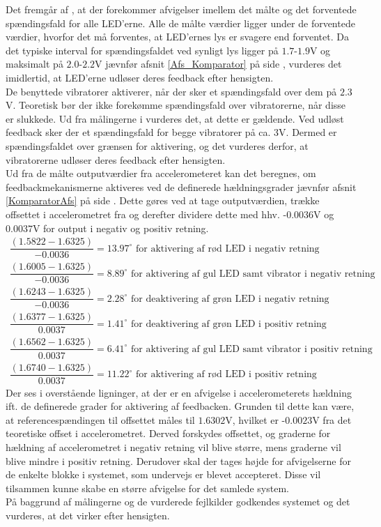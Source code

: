 Det fremgår af , at der forekommer afvigelser imellem det målte og det forventede spændingsfald for alle LED'erne. Alle de målte værdier ligger under de forventede værdier, hvorfor det må forventes, at LED'ernes lys er svagere end forventet. Da det typiske interval for spændingsfaldet ved synligt lys ligger på $1.7$-$1.9$V og maksimalt på $2.0$-$2.2$V jævnfør afsnit \ref{Afs_Komparator} på side \pageref{Afs_Komparator}, vurderes det imidlertid, at LED'erne udløser deres feedback efter hensigten.\\
De benyttede vibratorer aktiverer, når der sker et spændingsfald over dem på $2.3$V. \cite{Machinery2009} Teoretisk bør der ikke forekømme spændingsfald over vibratorerne, når disse er slukkede. Ud fra målingerne i  vurderes det, at dette er gældende. Ved udløst feedback sker der et spændingsfald for begge vibratorer på ca. $3$V. Dermed er spændingsfaldet over grænsen for aktivering, og det vurderes derfor, at vibratorerne udløser deres feedback efter hensigten. \\
Ud fra de målte outputværdier fra accelerometeret kan det beregnes, om feedbackmekanismerne aktiveres ved de definerede hældningsgrader jævnfør afsnit \ref{KomparatorAfs} på side \pageref{KomparatorAfs}. Dette gøres ved at tage outputværdien, trække offsettet i accelerometret fra og derefter dividere dette med hhv. -$0.0036$V og $0.0037$V for output i negativ og positiv retning.
\begin{align}\label{eq:graderLED_1}
\dfrac{(1.5822 - 1.6325)}{-0.0036} = 13.97^{\circ}\text{ for aktivering af rød LED i negativ retning} \\
\dfrac{(1.6005 - 1.6325)}{-0.0036} = 8.89^{\circ}\text{ for aktivering af gul LED samt vibrator i negativ retning} \\
\dfrac{(1.6243 - 1.6325)}{-0.0036} = 2.28^{\circ}\text{ for deaktivering af grøn LED i negativ retning} \\
\dfrac{(1.6377 - 1.6325)}{0.0037} = 1.41^{\circ}\text{ for deaktivering af grøn LED i positiv retning} \\
\dfrac{(1.6562 - 1.6325)}{0.0037} = 6.41^{\circ}\text{ for aktivering af gul LED samt vibrator i positiv retning} \\ \label{eq:graderLED_2}
\dfrac{(1.6740 - 1.6325)}{0.0037} = 11.22^{\circ}\text{ for aktivering af rød LED i positiv retning}
\end{align}
\noindent Der ses i overstående ligninger, at der er en afvigelse i accelerometerets hældning ift. de definerede grader for aktivering af feedbacken. Grunden til dette kan være, at referencespændingen til offsettet måles til $1.6302$V, hvilket er -$0.0023$V fra det teoretiske offset i accelerometret. Derved forskydes offsettet, og graderne for hældning af accelerometret i negativ retning vil blive større, mens graderne vil blive mindre i positiv retning. Derudover skal der tages højde for afvigelserne for de enkelte blokke i systemet, som undervejs er blevet accepteret. Disse vil tilsammen kunne skabe en større afvigelse for det samlede system. \\
På baggrund af målingerne og de vurderede fejlkilder godkendes systemet og det vurderes, at det virker efter hensigten.\\

